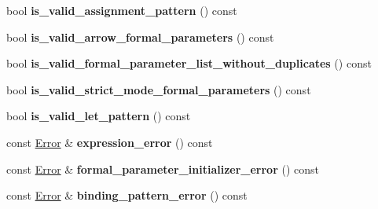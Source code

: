 \begin{DoxyCompactItemize}
\item 
bool {\bfseries is\+\_\+valid\+\_\+assignment\+\_\+pattern} () const \hypertarget{classv8_1_1internal_1_1_expression_classifier_af1cfbebef2d85537f4e5ed060886c90c}{}\label{classv8_1_1internal_1_1_expression_classifier_af1cfbebef2d85537f4e5ed060886c90c}

\item 
bool {\bfseries is\+\_\+valid\+\_\+arrow\+\_\+formal\+\_\+parameters} () const \hypertarget{classv8_1_1internal_1_1_expression_classifier_a9ae3c4315ebadd1d20d5301faf48467b}{}\label{classv8_1_1internal_1_1_expression_classifier_a9ae3c4315ebadd1d20d5301faf48467b}

\item 
bool {\bfseries is\+\_\+valid\+\_\+formal\+\_\+parameter\+\_\+list\+\_\+without\+\_\+duplicates} () const \hypertarget{classv8_1_1internal_1_1_expression_classifier_a796007a9e31734f05b59ef8e0c230100}{}\label{classv8_1_1internal_1_1_expression_classifier_a796007a9e31734f05b59ef8e0c230100}

\item 
bool {\bfseries is\+\_\+valid\+\_\+strict\+\_\+mode\+\_\+formal\+\_\+parameters} () const \hypertarget{classv8_1_1internal_1_1_expression_classifier_a2913270559364748177a074e78d230dd}{}\label{classv8_1_1internal_1_1_expression_classifier_a2913270559364748177a074e78d230dd}

\item 
bool {\bfseries is\+\_\+valid\+\_\+let\+\_\+pattern} () const \hypertarget{classv8_1_1internal_1_1_expression_classifier_aebb6f1874741c9e621bea08864059b88}{}\label{classv8_1_1internal_1_1_expression_classifier_aebb6f1874741c9e621bea08864059b88}

\item 
const \hyperlink{structv8_1_1internal_1_1_expression_classifier_1_1_error}{Error} \& {\bfseries expression\+\_\+error} () const \hypertarget{classv8_1_1internal_1_1_expression_classifier_a62b67ba7b27617e430f8048c55cef04c}{}\label{classv8_1_1internal_1_1_expression_classifier_a62b67ba7b27617e430f8048c55cef04c}

\item 
const \hyperlink{structv8_1_1internal_1_1_expression_classifier_1_1_error}{Error} \& {\bfseries formal\+\_\+parameter\+\_\+initializer\+\_\+error} () const \hypertarget{classv8_1_1internal_1_1_expression_classifier_aebd6b5969afa1adf315890f628d3f5d8}{}\label{classv8_1_1internal_1_1_expression_classifier_aebd6b5969afa1adf315890f628d3f5d8}

\item 
const \hyperlink{structv8_1_1internal_1_1_expression_classifier_1_1_error}{Error} \& {\bfseries binding\+\_\+pattern\+\_\+error} () const \hypertarget{classv8_1_1internal_1_1_expression_classifier_a31334d0e95461697890095b15d4e9fad}{}\label{classv8_1_1internal_1_1_expression_classifier_a31334d0e95461697890095b15d4e9fad}


\end{DoxyCompactItemize}
